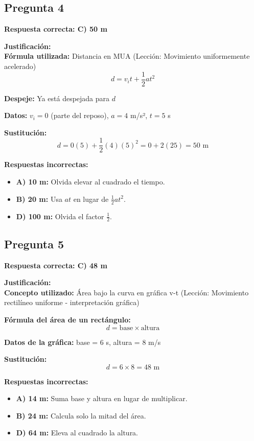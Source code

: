 \begin{respuestabox}
\subsection{Pregunta 4}
\textcolor{verdecorrecto}{\textbf{Respuesta correcta: C) 50 m}}

\textbf{Justificación:}\\
\textbf{Fórmula utilizada:} Distancia en MUA (Lección: Movimiento uniformemente acelerado)
$$d = v_i t + \frac{1}{2}at^2$$

\textbf{Despeje:} Ya está despejada para $d$

\textbf{Datos:} $v_i = 0$ (parte del reposo), $a = 4$ m/s², $t = 5$ s

\textbf{Sustitución:}
$$d = 0(5) + \frac{1}{2}(4)(5)^2 = 0 + 2(25) = 50 \text{ m}$$

\textbf{Respuestas incorrectas:}
\begin{itemize}
    \item \textbf{A) 10 m:} Olvida elevar al cuadrado el tiempo.
    \item \textbf{B) 20 m:} Usa $at$ en lugar de $\frac{1}{2}at^2$.
    \item \textbf{D) 100 m:} Olvida el factor $\frac{1}{2}$.
\end{itemize}
\end{respuestabox}

\newpage

\begin{respuestabox}
\subsection{Pregunta 5}
\textcolor{verdecorrecto}{\textbf{Respuesta correcta: C) 48 m}}

\textbf{Justificación:}\\
\textbf{Concepto utilizado:} Área bajo la curva en gráfica v-t (Lección: Movimiento rectilíneo uniforme - interpretación gráfica)

\textbf{Fórmula del área de un rectángulo:}
$$d = \text{base} \times \text{altura}$$

\textbf{Datos de la gráfica:} base = 6 s, altura = 8 m/s

\textbf{Sustitución:}
$$d = 6 \times 8 = 48 \text{ m}$$

\textbf{Respuestas incorrectas:}
\begin{itemize}
    \item \textbf{A) 14 m:} Suma base y altura en lugar de multiplicar.
    \item \textbf{B) 24 m:} Calcula solo la mitad del área.
    \item \textbf{D) 64 m:} Eleva al cuadrado la altura.
\end{itemize}
\end{respuestabox}


